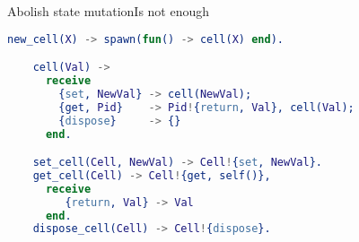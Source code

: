 \documentclass[rail]{beamer}
\begin{document}
\begin{frame}[fragile]{Abolish state mutation}{Is not enough}
  \begin{lstlisting}[language=erlang]
    new_cell(X) -> spawn(fun() -> cell(X) end).

    cell(Val) ->
      receive
        {set, NewVal} -> cell(NewVal);
        {get, Pid}    -> Pid!{return, Val}, cell(Val);
        {dispose}     -> {}
      end.

    set_cell(Cell, NewVal) -> Cell!{set, NewVal}.
    get_cell(Cell) -> Cell!{get, self()},
      receive
         {return, Val} -> Val
      end.
    dispose_cell(Cell) -> Cell!{dispose}.

  \end{lstlisting}
\end{frame}
\end{document}
